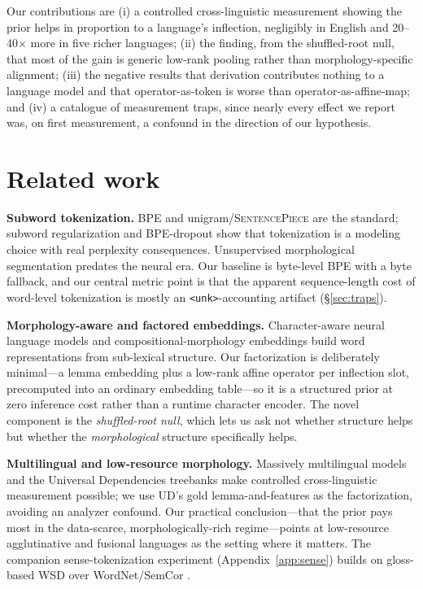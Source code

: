 \documentclass[11pt]{article}
\begin{document}
Our contributions are (i) a controlled cross-linguistic measurement showing the prior helps
in proportion to a language's inflection, negligibly in English and 20--40$\times$ more in
five richer languages; (ii) the finding, from the shuffled-root null, that most of the gain
is generic low-rank pooling rather than morphology-specific alignment; (iii) the negative
results that derivation contributes nothing to a language model and that operator-as-token is
worse than operator-as-affine-map; and (iv) a catalogue of measurement traps, since nearly
every effect we report was, on first measurement, a confound in the direction of our
hypothesis.

\section{Related work}
\textbf{Subword tokenization.} BPE \citep{sennrich2016bpe} and
unigram/\textsc{SentencePiece} \citep{kudo2018subword,kudo2018sentencepiece} are the
standard; subword regularization and BPE-dropout \citep{kudo2018subword,provilkov2020bpedropout}
show that tokenization is a modeling choice with real perplexity consequences. Unsupervised
morphological segmentation \citep{creutz2007morfessor} predates the neural era. Our baseline
is byte-level BPE with a byte fallback, and our central metric point is that the apparent
sequence-length cost of word-level tokenization is mostly an \texttt{<unk>}-accounting
artifact (\S\ref{sec:traps}).

\textbf{Morphology-aware and factored embeddings.} Character-aware neural language models
\citep{kim2016charaware} and compositional-morphology embeddings
\citep{botha2014compositional,vania2017characters} build word representations from
sub-lexical structure. Our factorization is deliberately minimal---a lemma embedding plus a
low-rank affine operator per inflection slot, precomputed into an ordinary embedding
table---so it is a structured prior at zero inference cost rather than a runtime character
encoder. The novel component is the \emph{shuffled-root null}, which lets us ask not whether
structure helps but whether the \emph{morphological} structure specifically helps.

\textbf{Multilingual and low-resource morphology.} Massively multilingual models
\citep{devlin2019bert,conneau2020xlmr} and the Universal Dependencies treebanks
\citep{nivre2020ud} make controlled cross-linguistic measurement possible; we use UD's gold
lemma-and-features as the factorization, avoiding an analyzer confound. Our practical
conclusion---that the prior pays most in the data-scarce, morphologically-rich
regime---points at low-resource agglutinative and fusional languages as the setting where it
matters. The companion sense-tokenization experiment (Appendix~\ref{app:sense}) builds on
gloss-based WSD \citep{huang2019glossbert,loureiro2019lmms} over
WordNet/SemCor \citep{fellbaum1998wordnet,miller1993semcor}.
\end{document}
